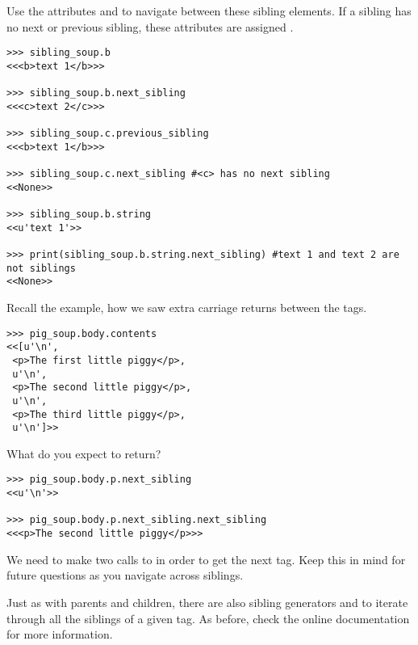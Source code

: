 Use the attributes  and  to navigate between these sibling elements.
If a sibling has no next or previous sibling, these attributes are assigned .

\begin{lstlisting}
>>> sibling_soup.b
<<<b>text 1</b>>>

>>> sibling_soup.b.next_sibling
<<<c>text 2</c>>>

>>> sibling_soup.c.previous_sibling
<<<b>text 1</b>>>

>>> sibling_soup.c.next_sibling #<c> has no next sibling
<<None>>

>>> sibling_soup.b.string
<<u'text 1'>>

>>> print(sibling_soup.b.string.next_sibling) #text 1 and text 2 are not siblings
<<None>>
\end{lstlisting}

Recall the  example, how we saw extra carriage returns between the  tags.
\begin{lstlisting}
>>> pig_soup.body.contents
<<[u'\n',
 <p>The first little piggy</p>,
 u'\n',
 <p>The second little piggy</p>,
 u'\n',
 <p>The third little piggy</p>,
 u'\n']>>
\end{lstlisting}
What do you expect  to return?
\begin{lstlisting}
>>> pig_soup.body.p.next_sibling
<<u'\n'>>

>>> pig_soup.body.p.next_sibling.next_sibling
<<<p>The second little piggy</p>>>
\end{lstlisting}
We need to make two calls to  in order to get the next  tag.
Keep this in mind for future questions as you navigate across siblings.

Just as with parents and children, there are also sibling generators  and  to iterate through all the siblings of a given tag.
As before, check the online documentation for more information.

